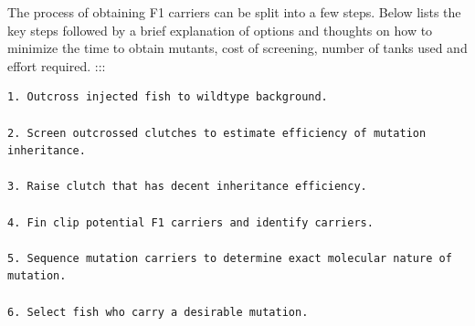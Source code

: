 \documentclass[
  letterpaper,
  DIV=11,
  numbers=noendperiod]{scrreprt}
\begin{document}
The process of obtaining F1 carriers can be split into a few steps.
Below lists the key steps followed by a brief explanation of options and
thoughts on how to minimize the time to obtain mutants, cost of
screening, number of tanks used and effort required. :::

\begin{verbatim}
1. Outcross injected fish to wildtype background. 

2. Screen outcrossed clutches to estimate efficiency of mutation inheritance.  

3. Raise clutch that has decent inheritance efficiency. 

4. Fin clip potential F1 carriers and identify carriers. 

5. Sequence mutation carriers to determine exact molecular nature of mutation. 

6. Select fish who carry a desirable mutation. 
\end{verbatim}
\end{document}

